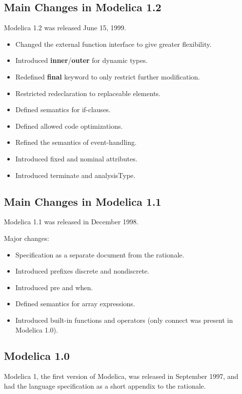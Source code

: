 \documentclass[../MLS.tex]{subfiles}
\begin{document}
\subsection{Main Changes in Modelica 1.2}
Modelica 1.2 was released June 15, 1999.

\begin{itemize}
\item
  Changed the external function interface to give greater flexibility.
\item
  Introduced \textbf{inner}/\textbf{outer} for dynamic types.
\item
  Redefined \textbf{final} keyword to only restrict further
  modification.
\item
  Restricted redeclaration to replaceable elements.
\item
  Defined semantics for if-clauses.
\item
  Defined allowed code optimizations.
\item
  Refined the semantics of event-handling.
\item
  Introduced fixed and nominal attributes.
\item
  Introduced terminate and analysisType.
\end{itemize}

\subsection{Main Changes in Modelica 1.1}
Modelica 1.1 was released in December 1998.

Major changes:

\begin{itemize}
\item
  Specification as a separate document from the rationale.
\item
  Introduced prefixes discrete and nondiscrete.
\item
  Introduced pre and when.
\item
  Defined semantics for array expressions.
\item
  Introduced built-in functions and operators (only connect was present
  in Modelica 1.0).
\end{itemize}

\subsection{Modelica 1.0}

Modelica 1, the first version of Modelica, was released in September
1997, and had the language specification as a short appendix to the
rationale.
\end{document}
